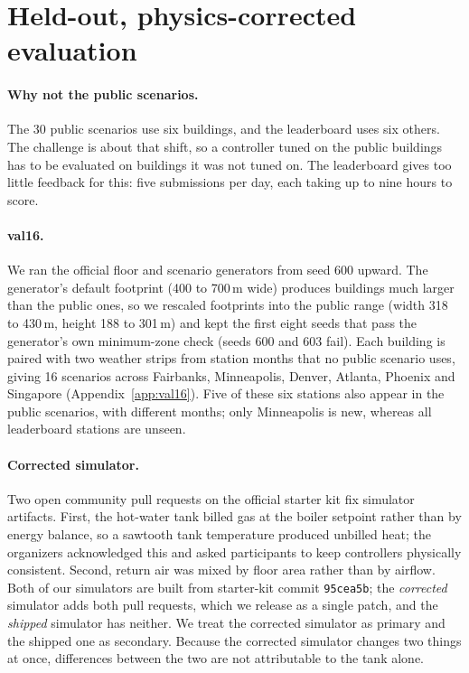 \documentclass{article}
\begin{document}
\section{Held-out, physics-corrected evaluation}
\label{sec:protocol}

\paragraph{Why not the public scenarios.} The 30 public scenarios use six buildings, and the leaderboard uses six others. The challenge is about that shift, so a controller tuned on the public buildings has to be evaluated on buildings it was not tuned on. The leaderboard gives too little feedback for this: five submissions per day, each taking up to nine hours to score.

\paragraph{val16.} We ran the official floor and scenario generators from seed 600 upward. The generator's default footprint (400 to 700\,m wide) produces buildings much larger than the public ones, so we rescaled footprints into the public range (width 318 to 430\,m, height 188 to 301\,m) and kept the first eight seeds that pass the generator's own minimum-zone check (seeds 600 and 603 fail). Each building is paired with two weather strips from station months that no public scenario uses, giving 16 scenarios across Fairbanks, Minneapolis, Denver, Atlanta, Phoenix and Singapore (Appendix~\ref{app:val16}). Five of these six stations also appear in the public scenarios, with different months; only Minneapolis is new, whereas all leaderboard stations are unseen.

\paragraph{Corrected simulator.} Two open community pull requests on the official starter kit fix simulator artifacts. First, the hot-water tank billed gas at the boiler setpoint rather than by energy balance, so a sawtooth tank temperature produced unbilled heat; the organizers acknowledged this and asked participants to keep controllers physically consistent. Second, return air was mixed by floor area rather than by airflow. Both of our simulators are built from starter-kit commit \texttt{95cea5b}; the \emph{corrected} simulator adds both pull requests, which we release as a single patch, and the \emph{shipped} simulator has neither. We treat the corrected simulator as primary and the shipped one as secondary. Because the corrected simulator changes two things at once, differences between the two are not attributable to the tank alone.
\end{document}
